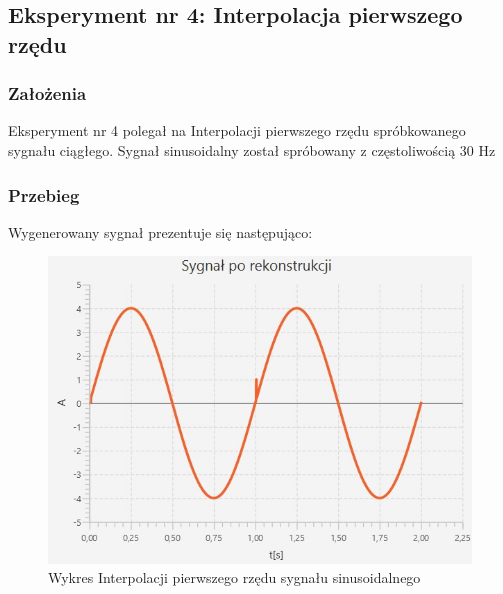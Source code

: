 \documentclass[12pt]{article}
\begin{document}

\newpage
\subsection{Eksperyment nr 4: Interpolacja pierwszego rzędu}

\subsubsection{Założenia}
Eksperyment nr 4 polegał na Interpolacji pierwszego rzędu spróbkowanego sygnału ciągłego. Sygnał sinusoidalny został spróbowany z częstoliwością 30 Hz
\subsubsection{Przebieg}
Wygenerowany sygnał prezentuje się następująco:
\begin{figure}[H]
	\centering
	\includegraphics[width=\linewidth]{sygnal_interpolacja_pierwszy.jpg}
	\caption{Wykres Interpolacji pierwszego rzędu sygnału sinusoidalnego}
	\label{wykres dla eksperymentu 4}
\end{figure}
\end{document}
